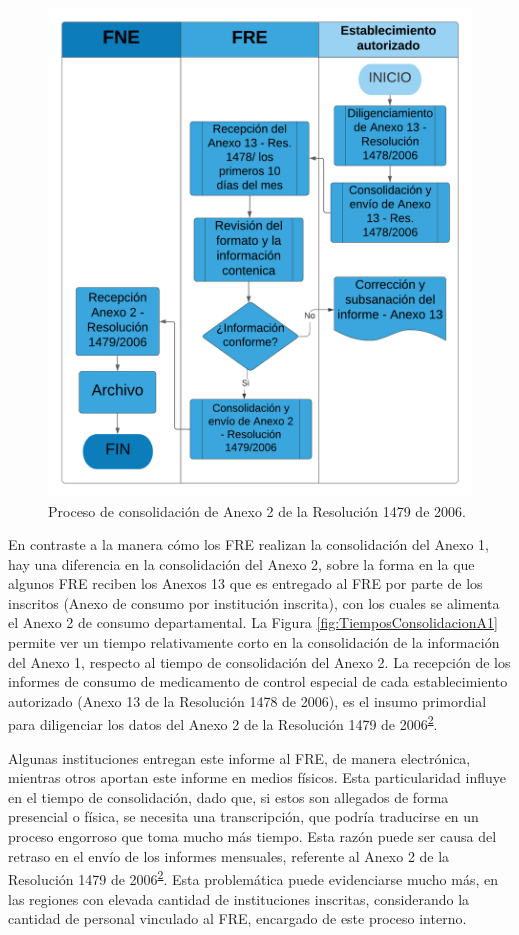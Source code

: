 \documentclass[
  oneside]{book}
\begin{document}
\begin{figure}

{\centering \includegraphics[width=0.8\linewidth]{figures/Consolidacion_A2_Res_1479_2006} 

}

\caption{Proceso de consolidación de Anexo 2 de la Resolución 1479 de 2006.}\label{fig:procesoA2-1479}
\end{figure}

En contraste a la manera cómo los FRE realizan la consolidación del Anexo 1, hay una diferencia en la consolidación del Anexo 2, sobre la forma en la que algunos FRE reciben los Anexos 13 que es entregado al FRE por parte de los inscritos (Anexo de consumo por institución inscrita), con los cuales se alimenta el Anexo 2 de consumo departamental. La Figura \ref{fig:TiemposConsolidacionA1} permite ver un tiempo relativamente corto en la consolidación de la información del Anexo 1, respecto al tiempo de consolidación del Anexo 2. La recepción de los informes de consumo de medicamento de control especial de cada establecimiento autorizado (Anexo 13 de la Resolución 1478 de 2006), es el insumo primordial para diligenciar los datos del Anexo 2 de la Resolución 1479 de 2006\textsuperscript{\protect\hyperlink{ref-MSPS1479-2006}{2}}.

Algunas instituciones entregan este informe al FRE, de manera electrónica, mientras otros aportan este informe en medios físicos. Esta particularidad influye en el tiempo de consolidación, dado que, si estos son allegados de forma presencial o física, se necesita una transcripción, que podría traducirse en un proceso engorroso que toma mucho más tiempo. Esta razón puede ser causa del retraso en el envío de los informes mensuales, referente al Anexo 2 de la Resolución 1479 de 2006\textsuperscript{\protect\hyperlink{ref-MSPS1479-2006}{2}}. Esta problemática puede evidenciarse mucho más, en las regiones con elevada cantidad de instituciones inscritas, considerando la cantidad de personal vinculado al FRE, encargado de este proceso interno.
\end{document}
